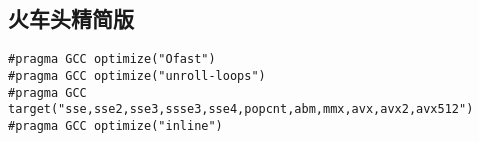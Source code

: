 \documentclass[a4paper,landscape,twocolumn]{ctexart}
\begin{document}

%

\subsection{火车头精简版}

\begin{lstlisting}[basicstyle=\footnotesize\ttfamily]
#pragma GCC optimize("Ofast")
#pragma GCC optimize("unroll-loops")
#pragma GCC target("sse,sse2,sse3,ssse3,sse4,popcnt,abm,mmx,avx,avx2,avx512")
#pragma GCC optimize("inline")
\end{lstlisting}
\end{document}
